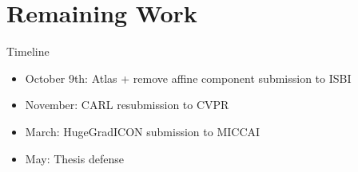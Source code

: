 \documentclass{beamer}
\begin{document}
\begin{frame}
\vspace*{-1pt}
\end{frame}
\begin{frame}
\vspace*{-1pt}
\end{frame}
\section{Remaining Work}
\begin{frame}{Timeline}
	\begin{itemize} 
		\item October 9th:  Atlas + remove affine component submission to ISBI
		\item November: CARL resubmission to CVPR
		\item March: HugeGradICON submission to MICCAI
		\item May: Thesis defense
	\end{itemize}
\end{frame}
	
\end{document}
